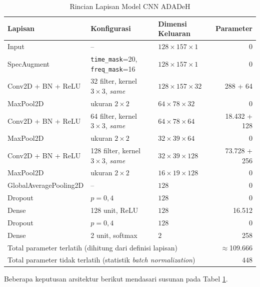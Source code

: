 \begin{table}[htbp]
  \centering
  \caption{Rincian Lapisan Model CNN ADADeH}
  \label{tab:lapisan-cnn}
  \footnotesize
  \setlength{\tabcolsep}{4pt}
  \begin{tabular}{@{}lllr@{}}
    \toprule
    \textbf{Lapisan} & \textbf{Konfigurasi} & \textbf{Dimensi Keluaran} & \textbf{Parameter} \\
    \midrule
    Input & -- & $128\times157\times1$ & 0 \\
    SpecAugment & \texttt{time\_mask}=20, \texttt{freq\_mask}=16 & $128\times157\times1$ & 0 \\
    Conv2D + BN + ReLU & 32 filter, kernel $3\times3$, \textit{same} & $128\times157\times32$ & 288 + 64 \\
    MaxPool2D & ukuran $2\times2$ & $64\times78\times32$ & 0 \\
    Conv2D + BN + ReLU & 64 filter, kernel $3\times3$, \textit{same} & $64\times78\times64$ & 18.432 + 128 \\
    MaxPool2D & ukuran $2\times2$ & $32\times39\times64$ & 0 \\
    Conv2D + BN + ReLU & 128 filter, kernel $3\times3$, \textit{same} & $32\times39\times128$ & 73.728 + 256 \\
    MaxPool2D & ukuran $2\times2$ & $16\times19\times128$ & 0 \\
    GlobalAveragePooling2D & -- & $128$ & 0 \\
    Dropout & $p{=}0{,}4$ & $128$ & 0 \\
    Dense & 128 unit, ReLU & $128$ & 16.512 \\
    Dropout & $p{=}0{,}4$ & $128$ & 0 \\
    Dense & 2 unit, softmax & $2$ & 258 \\
    \midrule
    \multicolumn{3}{l}{Total parameter terlatih (dihitung dari definisi lapisan)} & $\approx$109.666 \\
    \multicolumn{3}{l}{Total parameter tidak terlatih (statistik \textit{batch normalization})} & $448$ \\
    \bottomrule
  \end{tabular}
\end{table}

Beberapa keputusan arsitektur berikut mendasari susunan pada Tabel
\ref{tab:lapisan-cnn}.

